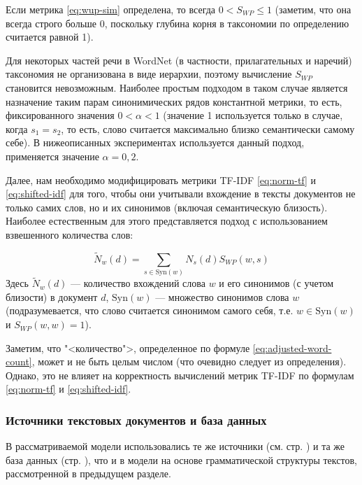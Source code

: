 Если метрика \eqref{eq:wup-sim} определена, то всегда $0 < S_{WP}\leqslant 1$ (заметим, что она всегда строго больше 0, поскольку
глубина корня в таксономии по определению считается равной 1).

Для некоторых частей речи в WordNet (в частности, прилагательных и наречий) таксономия не организована в виде иерархии, поэтому
вычисление $S_{WP}$ становится невозможным. Наиболее простым подходом в таком случае является назначение таким парам синонимических
рядов константной метрики, то есть, фиксированного значения $0 < \alpha < 1$ (значение 1 используется только в случае, когда $s_1=s_2$,
то есть, слово считается максимально близко семантически самому себе). В нижеописанных экспериментах используется данный подход,
применяется значение $\alpha=0{,}2$.

Далее, нам необходимо модифицировать метрики TF-IDF \eqref{eq:norm-tf} и \eqref{eq:shifted-idf} для того, чтобы они учитывали вхождение
в тексты документов не только самих слов, но и их синонимов (включая семантическую близость). Наиболее естественным для этого представляется
подход с использованием взвешенного количества слов:

\begin{equation}
    \label{eq:adjusted-word-count}
    \tilde{N}_w(d) = \sum\limits_{s\in\mathrm{Syn}(w)} N_s(d) S_{WP}(w, s)
\end{equation}
Здесь $\tilde{N}_w(d)$ --- количество вхождений слова $w$ и его синонимов (с учетом близости) в документ $d$, $\mathrm{Syn}(w)$ --- множество
синонимов слова $w$ (подразумевается, что слово считается синонимом самого себя, т.е. $w\in\mathrm{Syn}(w)$ и $S_{WP}(w, w)=1$).

Заметим, что "<количество">, определенное по формуле \eqref{eq:adjusted-word-count}, может и не быть целым числом (что очевидно следует из
определения). Однако, это не влияет на корректность вычислений метрик TF-IDF по формулам \eqref{eq:norm-tf} и \eqref{eq:shifted-idf}.

\subsubsection{Источники текстовых документов и база данных}
В рассматриваемой модели использовались те же источники (см. стр. \pageref{lab:sources-grammar}) и та же база данных (стр. \pageref{lab:db-grammar}),
что и в модели на основе грамматической структуры текстов, рассмотренной в предыдущем разделе.

